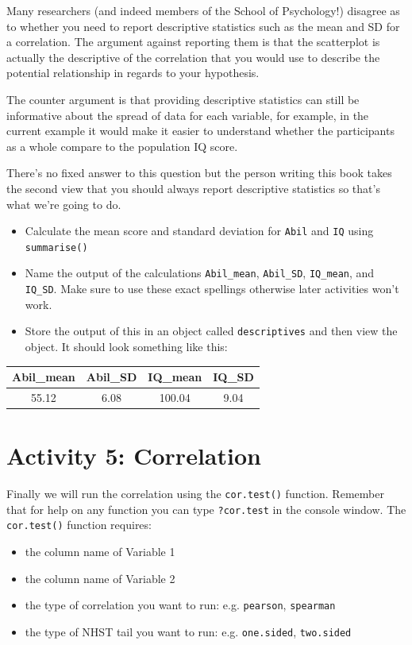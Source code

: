 \documentclass[]{book}
\providecommand{\tightlist}{%
  \setlength{\itemsep}{0pt}\setlength{\parskip}{0pt}}
\begin{document}
Many researchers (and indeed members of the School of Psychology!) disagree as to whether you need to report descriptive statistics such as the mean and SD for a correlation. The argument against reporting them is that the scatterplot is actually the descriptive of the correlation that you would use to describe the potential relationship in regards to your hypothesis.

The counter argument is that providing descriptive statistics can still be informative about the spread of data for each variable, for example, in the current example it would make it easier to understand whether the participants as a whole compare to the population IQ score.

There's no fixed answer to this question but the person writing this book takes the second view that you should always report descriptive statistics so that's what we're going to do.

\begin{itemize}
\tightlist
\item
  Calculate the mean score and standard deviation for \texttt{Abil} and \texttt{IQ} using \texttt{summarise()}
\item
  Name the output of the calculations \texttt{Abil\_mean}, \texttt{Abil\_SD}, \texttt{IQ\_mean}, and \texttt{IQ\_SD}. Make sure to use these exact spellings otherwise later activities won't work.
\item
  Store the output of this in an object called \texttt{descriptives} and then view the object. It should look something like this:
\end{itemize}

\begin{tabular}{c|c|c|c}
\hline
Abil\_mean & Abil\_SD & IQ\_mean & IQ\_SD\\
\hline
55.12 & 6.08 & 100.04 & 9.04\\
\hline
\end{tabular}

\hypertarget{activity-5-correlation}{%
\section{Activity 5: Correlation}\label{activity-5-correlation}}

Finally we will run the correlation using the \texttt{cor.test()} function. Remember that for help on any function you can type \texttt{?cor.test} in the console window. The \texttt{cor.test()} function requires:

\begin{itemize}
\tightlist
\item
  the column name of Variable 1
\item
  the column name of Variable 2
\item
  the type of correlation you want to run: e.g. \texttt{pearson}, \texttt{spearman}
\item
  the type of NHST tail you want to run: e.g. \texttt{one.sided}, \texttt{two.sided}
\end{itemize}
\end{document}
